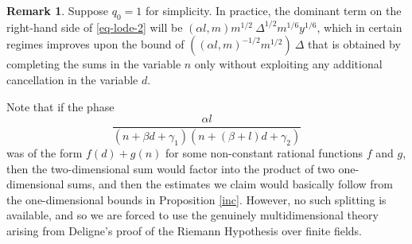 \documentclass[12pt,a4paper,reqno]{amsart}
\numberwithin{equation}{section}
\theoremstyle{plain}
\theoremstyle{definition}
\newtheorem{remark}[theorem]{Remark}
\begin{document}
\begin{remark} Suppose $q_0=1$ for simplicity.
  In practice, the dominant term on the right-hand side of \eqref{eq-lode-2} will be $(\alpha l,m) m^{1/2} \
  \Delta^{1/2} m^{1/6} y^{1/6}$, which in certain regimes improves
  upon the bound of $((\alpha l,m)^{-1/2} m^{1/2}) \ \Delta$ that is
  obtained by completing the sums in the variable $n$ only without
  exploiting any additional cancellation in the variable $d$.
\par
Note that if the phase 
$$
\frac{\alpha l}{(n+\beta
  d+\gamma_1)(n+(\beta+l)d+\gamma_2)}
$$ 
was of the form $f(d)+g(n)$ for some non-constant rational functions
$f$ and $g$, then the two-dimensional sum would factor into the
product of two one-dimensional sums, and then the estimates we claim
would basically follow from the one-dimensional bounds in
Proposition \ref{inc}.  However, no such splitting is available, and
so we are forced to use the genuinely multidimensional theory arising
from Deligne's proof of the Riemann Hypothesis over finite fields.
\end{remark}
\end{document}
